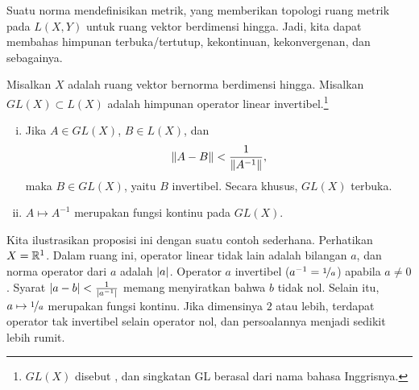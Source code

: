 Suatu norma mendefinisikan metrik,
yang memberikan topologi ruang metrik pada $L(X,Y)$ untuk ruang vektor berdimensi hingga.
Jadi, kita dapat membahas
himpunan terbuka/tertutup, kekontinuan, kekonvergenan, dan sebagainya.

\begin{prop} \label{prop:finitedimpropinv}
\pagebreak[2]
Misalkan $X$ adalah ruang vektor bernorma berdimensi hingga.
Misalkan $GL(X) \subset L(X)$ adalah himpunan operator linear
invertibel.\footnote{$GL(X)$ disebut
\emph{}, dan singkatan GL berasal dari nama
bahasa Inggrisnya.}
\begin{enumerate}[(i)]
\item \label{finitedimpropinv:i}
Jika $A \in GL(X)$, $B \in L(X)$, dan
\begin{equation} \label{eqcontineq}
\lVert {A-B} \rVert <  \frac{1}{\lVert {A^{-1}} \rVert},
\end{equation}
maka $B \in GL(X)$, yaitu $B$ invertibel.
Secara khusus, $GL(X)$ terbuka.
\item \label{finitedimpropinv:ii}
$A \mapsto A^{-1}$ merupakan fungsi
kontinu pada $GL(X)$.
\end{enumerate}
\end{prop}

Kita ilustrasikan proposisi ini dengan suatu contoh sederhana.
Perhatikan $X={\mathbb{R}}^1$.  Dalam ruang ini, operator linear tidak lain adalah
bilangan $a$, dan norma operator dari $a$ adalah $\lvert {a} \rvert$.
Operator $a$ invertibel ($a^{-1} = \nicefrac{1}{a}$)
apabila $a \neq 0$.  Syarat $\lvert {a-b} \rvert < \frac{1}{\lvert {a^{-1}} \rvert}$
memang menyiratkan bahwa $b$ tidak nol.  Selain itu, $a \mapsto \nicefrac{1}{a}$
merupakan fungsi kontinu.
Jika dimensinya $2$ atau lebih,
terdapat operator tak invertibel selain operator nol,
dan persoalannya menjadi sedikit lebih rumit.


